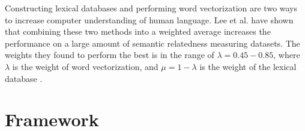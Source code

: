 \documentclass{article}
\begin{document}
Constructing lexical databases and performing word vectorization are two ways to increase computer understanding of human language. Lee et al. have shown that combining these two methods into a weighted average increases the performance on a large amount of semantic relatedness measuring datasets. The weights they found to perform the best is in the range of $\lambda = 0.45-0.85$, where $\lambda$ is the weight of word vectorization, and $\mu = 1-\lambda$ is the weight of the lexical database \cite{lee2016combining}.





\section{Framework} \label{sec:framework}
\end{document}
